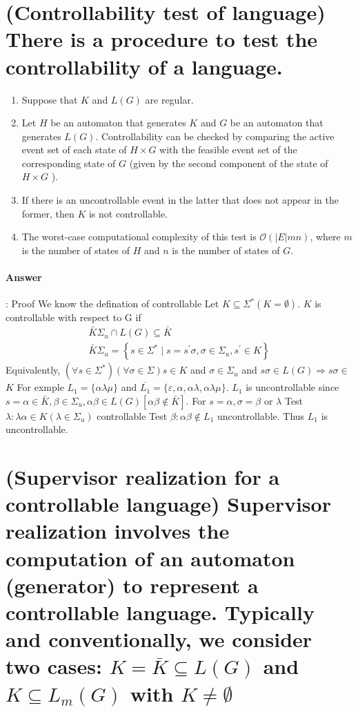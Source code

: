 \documentclass{article}
\begin{document}
\section{(Controllability test of language) There is a procedure to test the controllability of a language.}
\begin{enumerate}
  \item Suppose that $K$ and $L(G)$ are regular.
  \item Let $H$ be an automaton that generates $K$ and $G$ be an automaton that generates $L(G)$. Controllability can be checked by comparing the active event set of each state of $H \times G$ with the feasible event set of the corresponding state of $G$ (given by the second component of the state of $H \times G$ ).
  \item If there is an uncontrollable event in the latter that does not appear in the former, then $K$ is not controllable.
  \item The worst-case computational complexity of this test is $\mathcal{O}(|E| m n)$, where $m$ is the number of states of $H$ and $n$ is the number of states of $G$.
\end{enumerate}


\paragraph{Answer}:
Proof We know the defination of controllable Let $K \subseteq \Sigma^*(K=\emptyset)$. $K$ is controllable with respect to $\mathrm{G}$ if
$$
\begin{array}{r}
\bar{K} \Sigma_u \cap L(G) \subseteq \bar{K} \\
\bar{K} \Sigma_u=\left\{s \in \Sigma^* \mid s=s^{\prime} \sigma, \sigma \in \Sigma_u, s^{\prime} \in K\right\}
\end{array}
$$
Equivalently, $\left(\forall s \in \Sigma^*\right)(\forall \sigma \in \Sigma) s \in K$ and $\sigma \in \Sigma_u$ and $s \sigma \in L(G) \Rightarrow s \sigma \in$
$K$
For exmple $L_1=\{\alpha \lambda \mu\}$ and $\overline{L_1}=\{\varepsilon, \alpha, \alpha \lambda, \alpha \lambda \mu\}$. $L_1$ is uncontrollable since $s=\alpha \in \bar{K}, \beta \in \Sigma_u, \alpha \beta \in L(G)[\alpha \beta \notin \bar{K}]$. For $s=\alpha, \sigma=\beta$ or $\lambda$
Test $\lambda: \lambda \alpha \in K\left(\lambda \in \Sigma_u\right)$ controllable
Test $\beta: \alpha \beta \notin L_1$ uncontrollable. Thus $L_1$ is uncontrollable.


\section{(Supervisor realization for a controllable language) Supervisor realization involves the computation of an automaton (generator) to represent a controllable language. Typically and conventionally, we consider two cases: $K=\bar{K} \subseteq L(G)$ and $K \subseteq L_m(G)$ with $K \neq \emptyset$}
\end{document}
